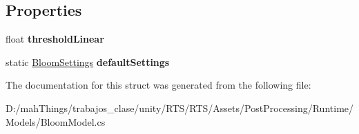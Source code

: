 \subsection*{Properties}
\begin{DoxyCompactItemize}
\item 
\mbox{\label{struct_unity_engine_1_1_post_processing_1_1_bloom_model_1_1_bloom_settings_a7f6ebd042c6cad8cad0eb684f4b0a148}} 
float {\bfseries threshold\+Linear}
\item 
\mbox{\label{struct_unity_engine_1_1_post_processing_1_1_bloom_model_1_1_bloom_settings_addcdcbd0f26e700c1857b06be41e462b}} 
static \mbox{\hyperlink{struct_unity_engine_1_1_post_processing_1_1_bloom_model_1_1_bloom_settings}{Bloom\+Settings}} {\bfseries default\+Settings}
\end{DoxyCompactItemize}


The documentation for this struct was generated from the following file\+:\begin{DoxyCompactItemize}
\item 
D\+:/mah\+Things/trabajos\+\_\+clase/unity/\+R\+T\+S/\+R\+T\+S/\+Assets/\+Post\+Processing/\+Runtime/\+Models/Bloom\+Model.\+cs\end{DoxyCompactItemize}
